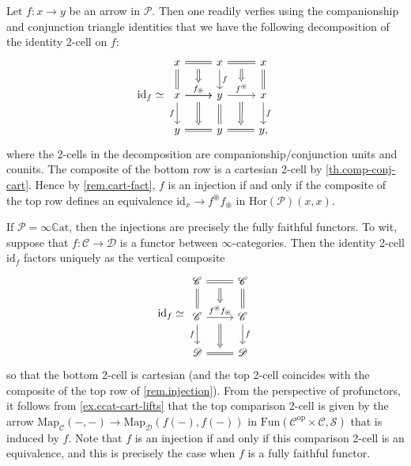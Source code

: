 \documentclass[a4paper, 11pt]{amsart}
\numberwithin{theorem}{section}
\theoremstyle{definition}
\newcommand{\op}{\mathrm{op}}
\newcommand{\map}{\mathrm{Map}}
\newcommand{\fun}{\mathrm{Fun}}
\renewcommand{\S}{\mathscr{S}}
\newcommand{\C}{\mathscr{C}}
\renewcommand{\D}{\mathscr{D}}
\renewcommand{\P}{\mathscr{P}}
\newcommand{\Hor}{\mathrm{Hor}}
\newcommand{\id}{\mathrm{id}}
\newcommand{\cart}[3]{{#1}^\circledast{#2}{#3}_\circledast}
\newcommand{\CCAT}{\mathbb{C}\mathrm{at}}
\begin{document}
\begin{remark}\label{rem.injection}
	Let $f : x \to y$ be an arrow in $\P$. Then one readily verfies using the companionship and conjunction triangle identities 
	that we have the following decomposition of the identity 2-cell on $f$: 
	\[
		\id_f \simeq
		\begin{tikzcd}
			x \arrow[r, equal,""name=h1]\arrow[d, equal] & x \arrow[r, equal, ""name=h4] \arrow[d, "f"] & x \arrow[d,equal] \\
			x \arrow[r, "f_\circledast"name=h2] \arrow[r]\arrow[d,"f"'] & y\arrow[d,equal] \arrow[r, "f^\circledast"name=h5] & x\arrow[d,"f"] \\
			y \arrow[r, equal, ""name=h3] & y \arrow[r, equal, ""name=h6] & y,
			\arrow[from=h1,to=h2, Rightarrow, shorten <= 6pt]
			\arrow[from=h2,to=h3, Rightarrow, shorten <= 6pt]
			\arrow[from=h4,to=h5, Rightarrow, shorten <= 6pt]
			\arrow[from=h5,to=h6, Rightarrow, shorten <= 6pt]
		\end{tikzcd}
	\]
	where the 2-cells in the decomposition are companionship/conjunction units and counits.  
	The composite of the bottom row is a cartesian 2-cell by \cref{th.comp-conj-cart}. Hence by \cref{rem.cart-fact}, $f$ is an injection if and only if the composite of the top row defines an equivalence $\id_x \to f^\circledast f_\circledast$ in $\Hor(\P)(x,x)$.
\end{remark}

\begin{example}
	If $\P = \infty\CCAT$, then the injections are precisely the fully faithful functors. To wit, suppose that $f : \C \rightarrow \D$ is a functor between 
	$\infty$-categories. Then  the identity 2-cell $\id_f$ factors uniquely as the vertical composite
	\[
		\id_f \simeq \begin{tikzcd}
			\C\arrow[d,equal] \arrow[r, equal, ""name=h1] & \C \arrow[d,equal] \\
			\C\arrow[d,"f"'] \arrow[r, "{\cart{f}{}{f}}"name=h2] & \C \arrow[d,"f"] \\
			\D \arrow[r,equal,""name=h3] & \D
			\arrow[from=h1, to=h2, Rightarrow, shorten <= 6pt]
			\arrow[from=h2, to=h3, Rightarrow, shorten <= 6pt]
		\end{tikzcd}
	\]
	so that the bottom 2-cell is cartesian (and the top 2-cell coincides with the composite of the top row of \cref{rem.injection}). From the perspective of profunctors,
	it follows from \cref{ex.ccat-cart-lifts} that the top comparison 2-cell is given by the arrow 
	$\map_\C(-,-) \rightarrow \map_\D(f(-),f(-))$ in $\fun(\C^\op \times \C, \S)$ that is induced by $f$. Note that 
	$f$ is an injection if and only if this comparison 2-cell is an equivalence, and this is precisely the case when $f$ is a fully faithful functor.
\end{example}
\end{document}
